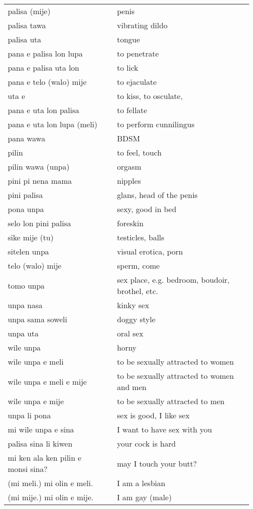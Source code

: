 \begin{supertabular}{p{4,5cm}|ll}
palisa (mije) && penis \\
palisa tawa && vibrating dildo \\
palisa uta && tongue \\
pana e palisa lon lupa && to penetrate \\
pana e palisa uta lon && to lick \\
pana e telo (walo) mije && to ejaculate \\ 
uta e && to kiss, to osculate,  \\
pana e uta lon palisa && to fellate \\
pana e uta lon lupa (meli) && to perform cunnilingus \\
pana wawa && BDSM \\
pilin && to feel, touch \\
pilin wawa (unpa) && orgasm \\
pini pi nena mama && nipples \\
pini palisa && glans, head of the penis \\
pona unpa && sexy, good in bed \\
selo lon pini palisa && foreskin \\
sike mije (tu) && testicles, balls \\
sitelen unpa && visual erotica, porn \\
telo (walo) mije && sperm, come \\
tomo unpa && sex place, e.g. bedroom, boudoir, brothel, etc. \\ 
unpa nasa && kinky sex \\
unpa sama soweli && doggy style \\
unpa uta && oral sex \\
wile unpa && horny \\
wile unpa e meli && to be sexually attracted to women \\
wile unpa e meli e mije && to be sexually attracted to women and men \\ 
wile unpa e mije && to be sexually attracted to men \\
unpa li pona && sex is good, I like sex \\
mi wile unpa e sina && I want to have sex with you \\
palisa sina li kiwen && your cock is hard \\
mi ken ala ken pilin e monsi sina? && may I touch your butt? \\
(mi meli.) mi olin e meli. && I am a lesbian \\
(mi mije.) mi olin e mije. && I am gay (male) \\
\end{supertabular} \\
%
%

